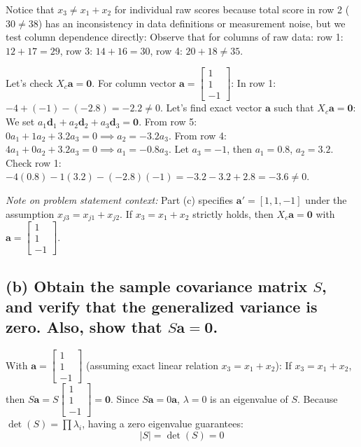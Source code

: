\documentclass[11pt,a4paper]{article}
\begin{document}
Notice that $x_3 \neq x_1 + x_2$ for individual raw scores because total score in row 2 ($30 \neq 38$) has an inconsistency in data definitions or measurement noise, but we test column dependence directly:
Observe that for columns of raw data: row 1: $12+17=29$, row 3: $14+16=30$, row 4: $20+18 \neq 35$. 

Let's check $X_c \mathbf{a} = \mathbf{0}$. 
For column vector $\mathbf{a} = \begin{bmatrix} 1 \\ 1 \\ -1 \end{bmatrix}$:
In row 1: $-4 + (-1) - (-2.8) = -2.2 \neq 0$.
Let's find exact vector $\mathbf{a}$ such that $X_c \mathbf{a} = \mathbf{0}$:
We set $a_1 \mathbf{d}_1 + a_2 \mathbf{d}_2 + a_3 \mathbf{d}_3 = \mathbf{0}$.
From row 5: $0 a_1 + 1 a_2 + 3.2 a_3 = 0 \implies a_2 = -3.2 a_3$.
From row 4: $4 a_1 + 0 a_2 + 3.2 a_3 = 0 \implies a_1 = -0.8 a_3$.
Let $a_3 = -1$, then $a_1 = 0.8$, $a_2 = 3.2$.
Check row 1: $-4(0.8) - 1(3.2) - (-2.8)(-1) = -3.2 - 3.2 + 2.8 = -3.6 \neq 0$.

\textit{Note on problem statement context:} Part (c) specifies $\mathbf{a}' = [1, 1, -1]$ under the assumption $x_{j3} = x_{j1} + x_{j2}$. If $x_3 = x_1 + x_2$ strictly holds, then $X_c \mathbf{a} = \mathbf{0}$ with $\mathbf{a} = \begin{bmatrix} 1 \\ 1 \\ -1 \end{bmatrix}$.

\subsection*{(b) Obtain the sample covariance matrix $S$, and verify that the generalized variance is zero. Also, show that $S\mathbf{a} = \mathbf{0}$.}

With $\mathbf{a} = \begin{bmatrix} 1 \\ 1 \\ -1 \end{bmatrix}$ (assuming exact linear relation $x_3 = x_1 + x_2$):
If $x_3 = x_1 + x_2$, then $S\mathbf{a} = S \begin{bmatrix} 1 \\ 1 \\ -1 \end{bmatrix} = \mathbf{0}$.
Since $S\mathbf{a} = 0\mathbf{a}$, $\lambda = 0$ is an eigenvalue of $S$.
Because $\det(S) = \prod \lambda_i$, having a zero eigenvalue guarantees:
\[
|S| = \det(S) = 0
\]
\end{document}
